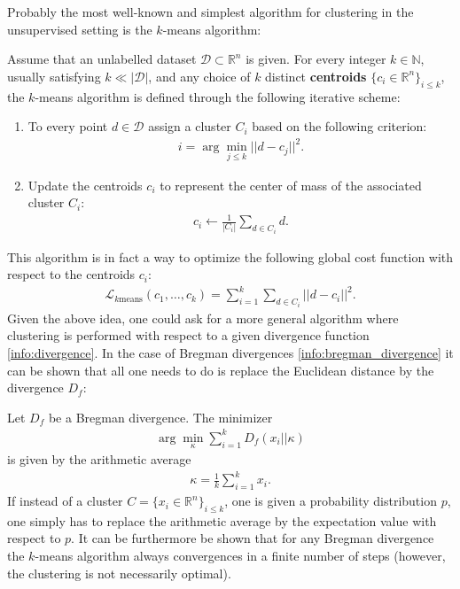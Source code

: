     Probably the most well-known and simplest algorithm for clustering in the unsupervised setting is the $k$-means algorithm:
    \begin{method}
        Assume that an unlabelled dataset $\mathcal{D}\subset\mathbb{R}^n$ is given. For every integer $k\in\mathbb{N}$, usually satisfying $k\ll|\mathcal{D}|$, and any choice of $k$ distinct \textbf{centroids} $\{c_i\in\mathbb{R}^n\}_{i\leq k}$, the $k$-means algorithm is defined through the following iterative scheme:
        \begin{enumerate}
            \item To every point $d\in\mathcal{D}$ assign a cluster $C_i$ based on the following criterion:
            \begin{gather}
                i = \arg\min_{j\leq k}||d-c_j||^2.
            \end{gather}
            \item Update the centroids $c_i$ to represent the center of mass of the associated cluster $C_i$:
            \begin{gather}
                c_i\longleftarrow\frac{1}{|C_i|}\sum_{d\in C_i}d.
            \end{gather}
        \end{enumerate}
    \end{method}
    This algorithm is in fact a way to optimize the following global cost function with respect to the centroids $c_i$:
    \begin{gather}
        \mathcal{L}_{k\text{means}}(c_1,\ldots,c_k) = \sum_{i=1}^k\sum_{d\in C_i}||d - c_i||^2.
    \end{gather}
    Given the above idea, one could ask for a more general algorithm where clustering is performed with respect to a given divergence function \ref{info:divergence}. In the case of Bregman divergences \ref{info:bregman_divergence} it can be shown that all one needs to do is replace the Euclidean distance by the divergence $D_f$:
    \begin{property}
        Let $D_f$ be a Bregman divergence. The minimizer
        \begin{gather}
            \arg\min_\kappa\sum_{i=1}^kD_f(x_i||\kappa)
        \end{gather}
        is given by the arithmetic average
        \begin{gather}
            \kappa = \frac{1}{k}\sum_{i=1}^kx_i.
        \end{gather}
        If instead of a cluster $C=\{x_i\in\mathbb{R}^n\}_{i\leq k}$, one is given a probability distribution $p$, one simply has to replace the arithmetic average by the expectation value with respect to $p$. It can be furthermore be shown that for any Bregman divergence the $k$-means algorithm always convergences in a finite number of steps (however, the clustering is not necessarily optimal).
    \end{property}

